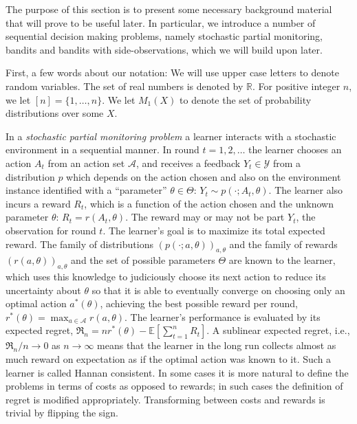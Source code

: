 \newcommand{\Y}{\mathcal{Y}}
\newcommand{\A}{\mathcal{A}}
\newcommand{\EE}[1]{\mathbb{E}\left[#1\right]}
\newcommand{\Prob}[1]{\mathbb{P}\left(#1\right)}
\newcommand{\Regret}{\mathfrak{R}}
\newcommand{\R}{\mathbb{R}} %
\newcommand{\Yti}{Y_t^i}
\newcommand{\Yt}{Y_t}
The purpose of this section is to present some necessary background material that will prove to be useful later.
In particular, we introduce a number of sequential decision making problems,
namely stochastic partial monitoring, bandits and bandits with side-observations, which we will build upon later.

First, a few words about our notation:
We will use upper case letters to denote random variables.
The set of real numbers is denoted by $\R$. For positive integer $n$, we let
$[n] = \{1,\dots,n\}$. %
We let $M_1(X)$ to denote the set of probability distributions over some $X$.

In a \emph{stochastic partial monitoring problem} a learner interacts with a stochastic environment in a sequential manner.
In round $t=1,2,\dots$ the learner chooses an action $A_t$ from an action set $\A$, and receives a feedback $Y_t\in \Y$
from a distribution $p$ which depends on the action chosen and also on the environment instance identified
with a ``parameter'' $\theta\in\Theta$:
$Y_t \sim p(\cdot;A_t,\theta)$. 
The learner also incurs a reward $R_t$, which is a function of the action chosen and the unknown parameter $\theta$:
$R_t = r(A_t,\theta)$. 
The reward may or may not be part $Y_t$, the observation for round $t$.
The learner's goal is to maximize its total expected reward.
The family of distributions $(p(\cdot;a,\theta))_{a,\theta}$ and the family of rewards $(r(a,\theta))_{a,\theta}$
and the set of possible parameters $\Theta$ are known to the learner, which uses this knowledge to judiciously choose
its next action to reduce its uncertainty about $\theta$ so that it is able to eventually converge on choosing only an 
optimal action $a^*(\theta)$, achieving the best possible reward per round, $r^*(\theta) = \max_{a\in \A} r(a,\theta)$.
The learner's performance is evaluated by its expected regret,
$\Regret_n = n r^*(\theta) - \EE{\sum_{t=1}^n R_t}$.
A sublinear expected regret, i.e., $\Regret_n/n \to 0$ as $n\to \infty$ means that the learner in the long run collects
almost as much reward on expectation as if the optimal action was known to it.
Such a learner is called Hannan consistent. 
In some cases it is more natural to define the problems in terms of costs as opposed to rewards;
in such cases the definition of regret is modified appropriately. 
Transforming between costs and rewards is trivial by flipping the sign.

